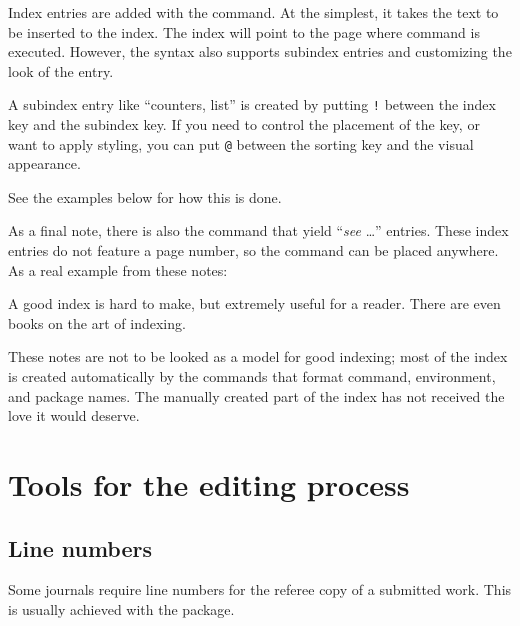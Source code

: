 Index entries are added with the  command.
At the simplest, it takes the text to be inserted to the index.
The index will point to the page where command is executed.
However, the syntax also supports subindex entries
and customizing the look of the entry.

A subindex entry like ``counters, list''
is created by putting \verb|!| between the index key and the subindex key.
If you need to control the placement of the key,
or want to apply styling,
you can put \verb|@| between the sorting key and the visual appearance.

See the examples below for how this is done.
\begin{ExampleCode}
\end{ExampleCode}

As a final note, there is also the  command
that yield ``\emph{see} \dots'' entries.
These index entries do not feature a page number,
so the command can be placed anywhere.
As a real example from these notes:
\begin{ExampleCode}
\end{ExampleCode}


\begin{practices}
A good index is hard to make, but extremely useful for a reader.
There are even books on the art of indexing.

These notes are not to be looked as a model for good indexing;
most of the index is created automatically by the commands
that format command, environment, and package names.
The manually created part of the index has not received the love it would deserve.
\end{practices}



%
%
%
\section{Tools for the editing process}

%
\subsection{Line numbers}

Some journals require line numbers for the referee copy of a submitted work.
This is usually achieved with the  package.

